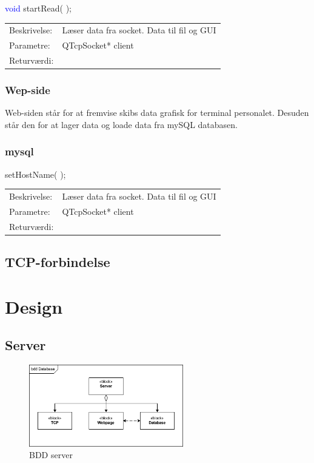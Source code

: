 \textcolor{blue}{void} startRead( \textcolor{blue}{} );
\begin{table}[H]
\begin{tabular}{l p{12.5cm}}
\hline
Beskrivelse:&Læser data fra socket. Data til fil og GUI\\
Parametre:&QTcpSocket* client\\
Returværdi:&\\
\end{tabular}
\end{table}

\subsubsection{Wep-side}
Web-siden står for at fremvise skibs data grafisk for terminal personalet. Desuden står den for at lager data og loade data fra mySQL databasen.\\
\subsubsection{mysql}
setHostName( \textcolor{blue}{} );
\begin{table}[H]
\begin{tabular}{l p{12.5cm}}
\hline
Beskrivelse:&Læser data fra socket. Data til fil og GUI\\
Parametre:&QTcpSocket* client\\
Returværdi:&\\
\end{tabular}
\end{table}

\subsection{TCP-forbindelse}

\section{Design}
\subsection{Server}
\begin{figure}[htbp]
	\centering
	\includegraphics[width=0.6\textwidth]{billeder/bdd_server}
	\caption{BDD server}
	\label{fig:bdd_server}
\end{figure}

